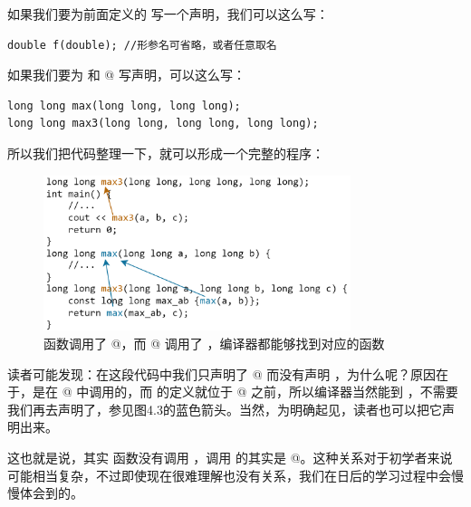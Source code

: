 如果我们要为前面定义的 \lstinline@f@ 写一个声明，我们可以这么写：
\begin{lstlisting}
double f(double); //形参名可省略，或者任意取名
\end{lstlisting}
如果我们要为 \lstinline@max@ 和 @ 写声明，可以这么写：
\begin{lstlisting}
long long max(long long, long long); 
long long max3(long long, long long, long long);
\end{lstlisting}\par
所以我们把代码整理一下，就可以形成一个完整的程序：
\par
\begin{figure}[htbp]
    \centering
    \includegraphics[width=0.8\textwidth]{../images/generalized_parts/04_max3_code_logic.drawio.png}
    \caption{\lstinline@main@ 函数调用了 @，而 @ 调用了 \lstinline@max@，编译器都能够找到对应的函数}
\end{figure}
读者可能发现：在这段代码中我们只声明了 @ 而没有声明 \lstinline@max@，为什么呢？原因在于，\lstinline@max@ 是在 @ 中调用的，而 \lstinline@max@ 的定义就位于 @ 之前，所以编译器当然能到 \lstinline@max@，不需要我们再去声明了，参见图4.3的蓝色箭头。当然，为明确起见，读者也可以把它声明出来。\par
这也就是说，其实 \lstinline@main@ 函数没有调用 \lstinline@max@，调用 \lstinline@max@ 的其实是 @。这种关系对于初学者来说可能相当复杂，不过即使现在很难理解也没有关系，我们在日后的学习过程中会慢慢体会到的。\par

